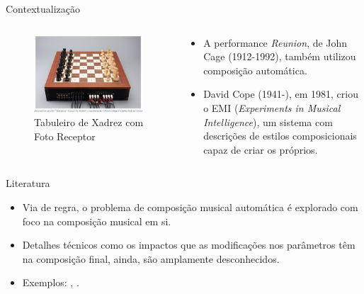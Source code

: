 \documentclass{beamer}
\begin{document}
    \begin{frame}{Contextualização}
        \begin{columns}[onlytextwidth,t]
            \begin{column}{0.5\textwidth}
                \centering
                \vspace{-0.5cm}
                \begin{figure}
                    \includegraphics[scale=0.32]{figuras/reunion_board.PNG}
                    \caption{Tabuleiro de Xadrez com Foto Receptor}
	            \end{figure}
            \end{column}
            \begin{column}{0.46\textwidth}
                \centering
                \begin{itemize}
                    \justifying
                    \item A performance \textit{Reunion}, de John Cage (1912-1992), também utilizou composição automática.
                    \item David Cope (1941-), em 1981, criou o EMI (\textit{Experiments in Musical Intelligence}), um sistema com descrições de estilos composicionais capaz de criar os próprios.
                \end{itemize}
            \end{column}
        \end{columns}
    \end{frame}

    \begin{frame}{Literatura}
        \begin{itemize}
            \justifying
            \item Via de regra, o problema de composição musical automática é explorado com foco na composição musical em si.
            \item Detalhes técnicos como os impactos que as modificações nos parâmetros têm na composição final, ainda, são amplamente desconhecidos.
            \item Exemplos: \citet{agarwala2017}, \citet{kuang2021}.
        \end{itemize}
    \end{frame}
    
\end{document}
